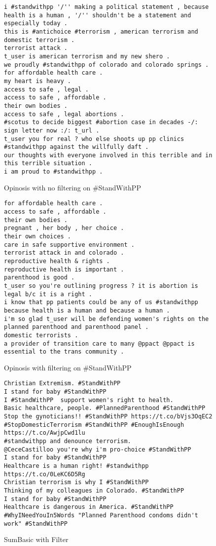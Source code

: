\documentclass[paper=letter, fontsize=12pt]{article}
\begin{document}
\begin{figure}[h]
\begin{verbatim}
i #standwithpp '/'' making a political statement , because health is a human , '/'' shouldn't be a statement and especially today .
this is #antichoice #terrorism , american terrorism and domestic terrorism .
terrorist attack .
t_user is american terrorism and my new shero .
we proudly #standwithpp of colorado and colorado springs .
for affordable health care .
my heart is heavy .
access to safe , legal .
access to safe , affordable .
their own bodies .
access to safe , legal abortions .
#scotus to decide biggest #abortion case in decades -/: sign letter now :/: t_url .
t_user you for real ? who else shoots up pp clinics #standwithpp against the willfully daft .
our thoughts with everyone involved in this terrible and in this terrible situation .
i am proud to #standwithpp .
\end{verbatim}
  \caption{Opinosis with no filtering on \#StandWithPP}
  \label{fig:opno}
\end{figure}

\begin{figure}[h]
\begin{verbatim}
for affordable health care .
access to safe , affordable .
their own bodies .
pregnant , her body , her choice .
their own choices .
care in safe supportive environment .
terrorist attack in and colorado .
reproductive health & rights .
reproductive health is important .
parenthood is good .
t_user so you're outlining progress ? it is abortion is legal b/c it is a right .
i know that pp patients could be any of us #standwithpp because health is a human and because a human .
i'm so glad t_user will be defending women's rights on the planned parenthood and parenthood panel .
domestic terrorists .
a provider of transition care to many @ppact @ppact is essential to the trans community .
\end{verbatim}
  \caption{Opinosis with filtering on \#StandWithPP}
  \label{fig:opyes}
\end{figure}

\begin{figure}[h]
\begin{verbatim}
Christian Extremism. #StandWithPP
I stand for baby #StandWithPP
I #StandWithPP  support women's right to health.
Basic healthcare, people. #PlannedParenthood #StandWithPP
Stop the gynoticians!! #StandWithPP https://t.co/bVjs3OqEC2
#StopDomesticTerrorism #StandWithPP #EnoughIsEnough https://t.co/AwjpCwd1lu
#standwithpp and denounce terrorism.
@CeceCastilloo you're why i'm pro-choice #StandWithPP
I stand for baby #StandWithPP
Healthcare is a human right! #standwithpp https://t.co/0LeKC6D5Rg
Christian terrorism is why I #StandWithPP
Thinking of my colleagues in Colorado. #StandWithPP
I stand for baby #StandWithPP
Healthcare is dangerous in America. #StandWithPP
#WhyINeedYouIn5Words "Planned Parenthood condoms didn't work" #StandWithPP
\end{verbatim}
  \caption{SumBasic with Filter}
  \label{fig:sumyes}
\end{figure}
\end{document}
